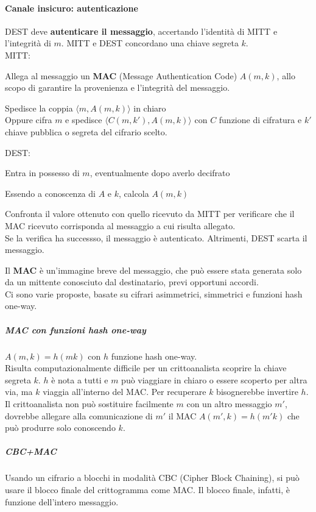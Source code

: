 \documentclass[10pt]{book}
\begin{document}
\paragraph{Canale insicuro: autenticazione} DEST deve \textbf{autenticare il messaggio}, accertando l'identità di MITT e l'integrità di $m$. MITT e DEST concordano una chiave segreta $k$.\\
MITT:
\begin{list}{}{}
	\item Allega al messaggio un \textbf{MAC} (Message Authentication Code) $A(m,k)$, allo scopo di garantire la provenienza e l'integrità del messaggio.
	\item Spedisce la coppia $\langle m, A(m,k)\rangle$ in chiaro\\
Oppure cifra $m$ e spedisce $\langle C(m,k'), A(m,k)\rangle$ con $C$ funzione di cifratura e $k'$ chiave pubblica o segreta del cifrario scelto.
\end{list}
DEST:
\begin{list}{}{}
	\item Entra in possesso di $m$, eventualmente dopo averlo decifrato
	\item Essendo a conoscenza di $A$ e $k$, calcola $A(m,k)$
	\item Confronta il valore ottenuto con quello ricevuto da MITT per verificare che il MAC ricevuto corrisponda al messaggio a cui risulta allegato.\\
	Se la verifica ha successso, il messaggio è autenticato. Altrimenti, DEST scarta il messaggio.
\end{list}
Il \textbf{MAC} è un'immagine breve del messaggio, che può essere stata generata solo da un mittente conosciuto dal destinatario, previ opportuni accordi.\\
Ci sono varie proposte, basate su cifrari asimmetrici, simmetrici e funzioni hash one-way.
\subparagraph{MAC con funzioni hash one-way} $A(m,k) = h(mk)$ con $h$ funzione hash one-way.\\
Risulta computazionalmente difficile per un crittoanalista scoprire la chiave segreta $k$. $h$ è nota a tutti e $m$ può viaggiare in chiaro o essere scoperto per altra via, ma $k$ viaggia all'interno del MAC. Per recuperare $k$ bisognerebbe invertire $h$.\\
Il crittoanalista non può sostituire facilmente $m$ con un altro messaggio $m'$, dovrebbe allegare alla comunicazione di $m'$ il MAC $A(m',k) = h(m'k)$ che può produrre solo conoscendo $k$.
\subparagraph{CBC+MAC} Usando un cifrario a blocchi in modalità CBC (Cipher Block Chaining), si può usare il blocco finale del crittogramma come MAC. Il blocco finale, infatti, è funzione dell'intero messaggio.
\end{document}
